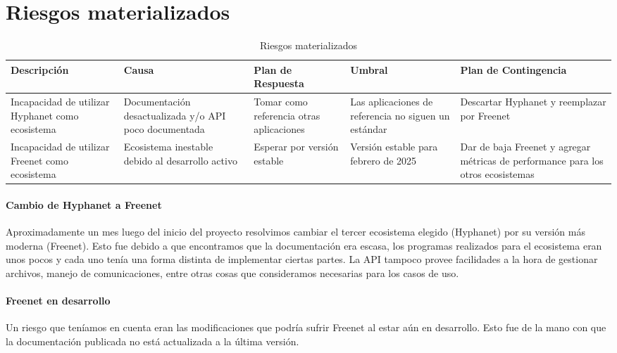 \section{Riesgos materializados}

\setlength\tabcolsep{3pt}
\begin{table}[!htbp]
    \centering
    \begin{tabular}{*{5}{|p{80pt}}|}
    \hline
    \textbf{Descripción} & \textbf{Causa} & \textbf{Plan \break de \break Respuesta} & \textbf{Umbral} & \textbf{Plan \break de \break Contingencia} \\
    \hline\hline
    Incapacidad de utilizar Hyphanet como ecosistema & Documentación desactualizada y/o API poco documentada & Tomar como referencia otras aplicaciones & Las aplicaciones de referencia no siguen un estándar & Descartar Hyphanet y reemplazar por Freenet \\
    \hline
    Incapacidad de utilizar Freenet como ecosistema & Ecosistema inestable debido al desarrollo activo & Esperar por versión estable & Versión estable para febrero de 2025 & Dar de baja Freenet y agregar métricas de performance para los otros ecosistemas \\
    \hline
    \end{tabular}
    \caption{Riesgos materializados}
\end{table}

\paragraph{Cambio de Hyphanet a Freenet}
Aproximadamente un mes luego del inicio del proyecto resolvimos cambiar el tercer ecosistema elegido (Hyphanet) por su versión más moderna (Freenet). Esto fue debido a que encontramos que la documentación era escasa, los programas realizados para el ecosistema eran unos pocos y cada uno tenía una forma distinta de implementar ciertas partes. La API tampoco provee facilidades a la hora de gestionar archivos, manejo de comunicaciones, entre otras cosas que consideramos necesarias para los casos de uso.

\paragraph{Freenet en desarrollo}
Un riesgo que teníamos en cuenta eran las modificaciones que podría sufrir Freenet al estar aún en desarrollo. Esto fue de la mano con que la documentación publicada no está actualizada a la última versión.

